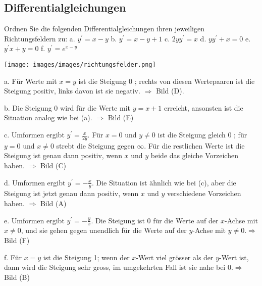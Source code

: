 \subsection*{Differentialgleichungen}

\begin{example}
Ordnen Sie die folgenden Differentialgleichungen ihren jeweiligen Richtungsfeldern zu:
a. $y^{\prime}=x-y$
b. $y^{\prime}=x-y+1$
c. $2 y y^{\prime}=x$
d. $y y^{\prime}+x=0$
e. $y^{\prime} x+y=0$
f. $y^{\prime}=e^{x-y}$

\texttt{[image: images/images/richtungsfelder.png]}

a. Für Werte mit $x=y$ ist die Steigung 0 ; rechts von diesen Wertepaaren ist die Steigung positiv, links davon ist sie negativ. $\Rightarrow$ Bild (D).

b. Die Steigung 0 wird für die Werte mit $y=x+1$ erreicht, ansonsten ist die Situation analog wie bei (a). $\Rightarrow$ Bild (E)

c. Umformen ergibt $y^{\prime}=\frac{x}{2 y}$. Für $x=0$ und $y \neq 0$ ist die Steigung gleich 0 ; für $y=0$ und $x \neq 0$ strebt die Steigung gegen $\infty$. Für die restlichen Werte ist die Steigung ist genau dann positiv, wenn $x$ und $y$ beide das gleiche Vorzeichen haben. $\Rightarrow$ Bild (C)

d. Umformen ergibt $y^{\prime}=-\frac{x}{y}$. Die Situation ist ähnlich wie bei (c), aber die Steigung ist jetzt genau dann positiv, wenn $x$ und $y$ verschiedene Vorzeichen haben. $\Rightarrow$ Bild (A)

e. Umformen ergibt $y^{\prime}=-\frac{y}{x}$. Die Steigung ist 0 für die Werte auf der $x$-Achse mit $x \neq 0$, und sie gehen gegen unendlich für die Werte auf der $y$-Achse mit $y \neq 0 . \Rightarrow$ Bild (F)

f. Für $x=y$ ist die Steigung 1; wenn der $x$-Wert viel grösser als der $y$-Wert ist, dann wird die Steigung sehr gross, im umgekehrten Fall ist sie nahe bei $0 . \Rightarrow$ Bild (B)

\end{example}

